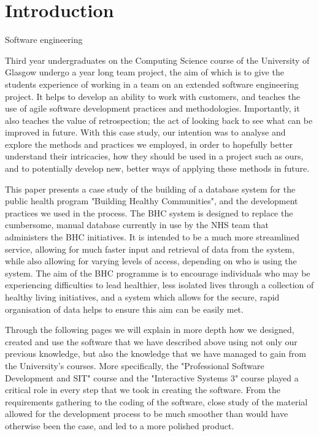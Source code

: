 \documentclass{l3proj}
\begin{document}
\educationalconsent

\newpage

\section{Introduction}

Software engineering 

Third year undergraduates on the Computing Science course of the University of Glasgow undergo a year long team project, the aim of which is to give the students experience of working in a team on an extended software engineering project. It helps to develop an ability to work with customers, and teaches the use of agile software development practices and methodologies. Importantly, it also teaches the value of retrospection; the act of looking back to see what can be improved in future. With this case study, our intention was to analyse and explore the methods and practices we employed, in order to hopefully better understand their intricacies, how they should be used in a project such as ours, and to potentially develop new, better ways of applying these methods in future.

This paper presents a case study of the building of a database system for the public health program "Building Healthy Communities", and the development practices we used in the process. The BHC system is designed to replace the cumbersome, manual database currently in use by the NHS team that administers the BHC initiatives. It is intended to be a much more streamlined service, allowing for much faster input and retrieval of data from the system, while also allowing for varying levels of access, depending on who is using the system. The aim of the BHC programme is to encourage individuals who may be experiencing difficulties to lead healthier, less isolated lives through a collection of healthy living initiatives, and a system which allows for the secure, rapid organisation of data helps to ensure this aim can be easily met.

Through the following pages we will explain in more depth how we designed, created and use the software that we have described above using not only our previous knowledge, but also the knowledge that we have managed to gain from the University's courses. More specifically, the "Professional Software Development and SIT" course and the "Interactive Systems 3" course played a critical role in every step that we took in creating the software. From the requirements gathering to the coding of the software, close study of the material allowed for the development process to be much smoother than would have otherwise been the case, and led to a more polished product.
\end{document}

